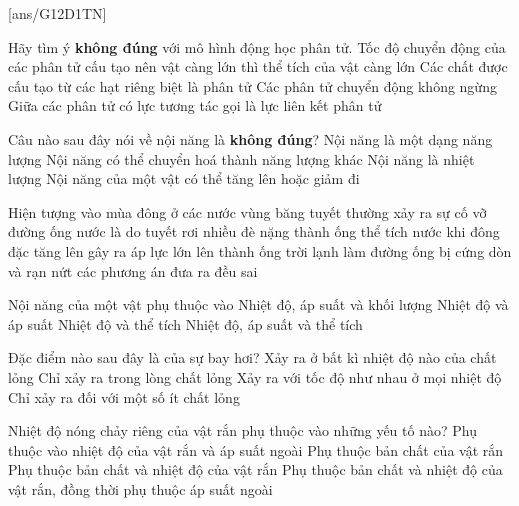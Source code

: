 [ans/G12D1TN]
\begin{ex}
	Hãy tìm ý \textbf{không đúng} với mô hình động học phân tử.
	\choice
	{\True Tốc độ chuyển động của các phân tử cấu tạo nên vật càng lớn thì thể tích của vật càng lớn}
	{Các chất được cấu tạo từ các hạt riêng biệt là phân tử}
	{Các phân tử chuyển động không ngừng}
	{Giữa các phân tử có lực tương tác gọi là lực liên kết phân tử}
	\loigiai{}
\end{ex}

\begin{ex}
	Câu nào sau đây nói về nội năng là \textbf{không đúng}?
	\choice
	{Nội năng là một dạng năng lượng}
	{Nội năng có thể chuyển hoá thành năng lượng khác}
	{\True Nội năng là nhiệt lượng}
	{Nội năng của một vật có thể tăng lên hoặc giảm đi}
	\loigiai{}
\end{ex}
\begin{ex}
	Hiện tượng vào mùa đông ở các nước vùng băng tuyết thường xảy ra sự cố vỡ đường ống nước là do
	\choice
	{tuyết rơi nhiều đè nặng thành ống}
	{\True thể tích nước khi đông đặc tăng lên gây ra áp lực lớn lên thành ống}
	{trời lạnh làm đường ống bị cứng dòn và rạn nứt}
	{các phương án đưa ra đều sai}
	\loigiai{}
\end{ex}

\begin{ex}
	Nội năng của một vật phụ thuộc vào
	\choice
	{Nhiệt độ, áp suất và khối lượng}
	{Nhiệt độ và áp suất}
	{\True Nhiệt độ và thể tích}
	{Nhiệt độ, áp suất và thể tích}
	\loigiai{}
\end{ex}
\begin{ex}
	Đặc điểm nào sau đây là của sự bay hơi?
	\choice
	{\True Xảy ra ở bất kì nhiệt độ nào của chất lỏng}
	{Chỉ xảy ra trong lòng chất lỏng}
	{Xảy ra với tốc độ như nhau ở mọi nhiệt độ}
	{Chỉ xảy ra đối với một số ít chất lỏng}
	\loigiai{}
\end{ex}

\begin{ex}
	Nhiệt độ nóng chảy riêng của vật rắn phụ thuộc vào những yếu tố nào?
	\choice
	{Phụ thuộc vào nhiệt độ của vật rắn và áp suất ngoài}
	{\True Phụ thuộc bản chất của vật rắn}
	{Phụ thuộc bản chất và nhiệt độ của vật rắn}
	{Phụ thuộc bản chất và nhiệt độ của vật rắn, đồng thời phụ thuộc áp suất ngoài}
	\loigiai{}
\end{ex}

